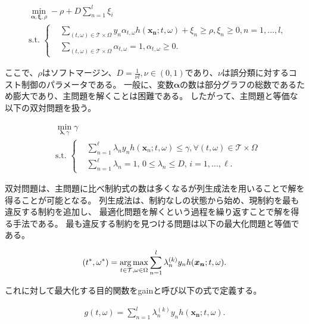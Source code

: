 \begin{align}
	&\min_{\bm{\alpha},\bm{\xi},\rho} -\rho + D \sum_{n=1}^{l} \xi_{i} \nonumber\\
	&\text{s.t.} \,\,\left\{
	\begin{aligned}
		&\sum_{(t,\omega) \in \mathcal{T} \times \Omega} y_{n} \alpha_{t,\omega} h(\bm{x_{n}};t,\omega) + \xi_{n} \geq \rho,
		\xi_{n} \geq 0,	n = 1, \dots , l,\nonumber \\
		&\sum_{(t,\omega) \in \mathcal{T} \times \Omega} \alpha_{t, \omega} = 1, \alpha_{t, \omega} \geq 0.
	\end{aligned}\right.
\end{align}

ここで、$\rho$はソフトマージン、$D=\frac{1}{\nu l}, \nu \in (0,1)$であり、$\nu$は誤分類に対するコスト制御のパラメータである。
一般に、変数$\bm{\alpha}$の数は部分グラフの総数であるため膨大であり、主問題を解くことは困難である。
したがって、主問題と等価な以下の双対問題を扱う。

\begin{align}
	\label{eq:dualprob}
	&\min_{\bm{\lambda},\gamma} \gamma \nonumber\\
	&\text{s.t.} \,\,\left\{
	\begin{aligned}
		& \sum_{n=1}^{\ell} \lambda_{n} y_{n} h(\bm{x}_{n};t,\omega) \leq \gamma,
		\forall(t,\omega) \in \mathcal{T} \times \Omega\\
		& \sum_{n=1}^{\ell} \lambda_{n} = 1, \,0 \leq \lambda_{n} \leq D, \,i = 1, \dots , \ell. 
	\end{aligned}\right. \end{align}

双対問題は、主問題に比べ制約式の数は多くなるが列生成法を用いることで解を得ることが可能となる。
列生成法は、制約なしの状態から始め、現制約を最も違反する制約を追加し、
最適化問題を解くという過程を繰り返すことで解を得る手法である。
最も違反する制約を見つける問題は以下の最大化問題と等価である。

\begin{equation*}
	(t^{*}, \omega^{*}) = \operatorname*{arg\,max}_{t \in \mathcal{T} , \omega \in \Omega} \sum_{n=1}^{l} \lambda_{n}^{(k)} y_{n} h(\bm{x_{n}} ; t, \omega).
\end{equation*}

これに対して最大化する目的関数をgainと呼び以下の式で定義する。

\begin{align}
	\label{eq:gain}
	g(t, \omega) = \sum_{n=1}^{l} \lambda_{n}^{(k)} y_{n} h(\bm{x_{n}} ; t, \omega).
\end{align}

